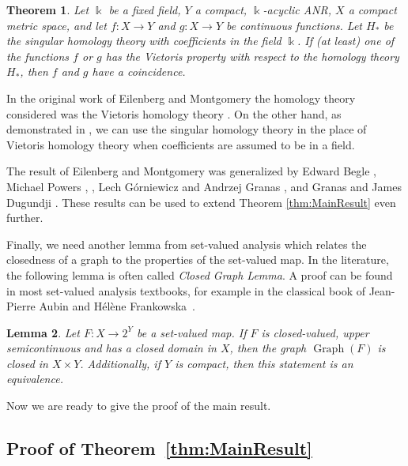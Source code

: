 \documentclass[a4paper,11pt,reqno,english]{amsart}
\newtheorem{theorem}{Theorem}[section]
\newtheorem{lemma}[theorem]{Lemma}
\theoremstyle{definition}
\begin{document}
\begin{theorem}\label{thm:EilenbergCoincidenceCondition}
	Let $\Bbbk$ be a fixed field, $Y$ a compact, $\Bbbk$-acyclic {\rm ANR}, $X$ a compact metric space, and let $f\colon X\longrightarrow Y$ and $g\colon X\longrightarrow Y$ be continuous functions.
	Let $H_*$ be the singular homology theory with coefficients in the field $\Bbbk$.
	If (at least) one of the functions $f$ or $g$ has the Vietoris property with respect to the homology theory $H_*$, then $f$ and $g$ have a coincidence.
\end{theorem}

\medskip
In the original work of Eilenberg and Montgomery the homology theory considered was the Vietoris homology theory \cite{Vietoris1927}.
On the other hand, as demonstrated in  \cite[Prop.\,2.2]{Tesfatsion1983}, we can use the singular homology theory in the place of Vietoris homology theory when coefficients are assumed to be in a field.

The result of Eilenberg and Montgomery was generalized by Edward Begle \cite[Thm.\,2]{Begle1950},  Michael Powers \cite[Thm.\,6.3]{Powers1970}, \cite[Thm.\,5.6]{Powers1972}, Lech G\'{o}rniewicz  and Andrzej Granas \cite{GorniewiczGranas}, and Granas  and James Dugundji \cite[Cor.\,19.7.5]{GranasDugundji2003}.
These results can be used to extend Theorem \ref{thm:MainResult} even further.

\medskip
Finally, we need another lemma from set-valued analysis which relates the closedness of a graph to the properties of the set-valued map. In the literature, the following lemma is often called \textit{Closed Graph Lemma}. A proof can be found in most set-valued analysis textbooks, for example in the classical book of Jean-Pierre Aubin and H\'el\`ene Frankowska~\cite[Prop. 1.4.8]{Aubin_Frankowska_2009}.

\begin{lemma}\label{lem:ClosedGraphLemma}
	Let $F\colon X\longrightarrow 2^Y$ be a set-valued map.
	If $F$ is closed-valued, upper semicontinuous and has a closed domain in $X$, then the graph $\operatorname{Graph}(F)$ is closed in $X\times Y$.
	Additionally, if $Y$ is compact, then this statement is an equivalence.
\end{lemma}

Now we are ready to give the proof of the main result.

\subsection{Proof of Theorem~\ref{thm:MainResult}}\label{subsec:ProofOfMainResult}
\end{document}

